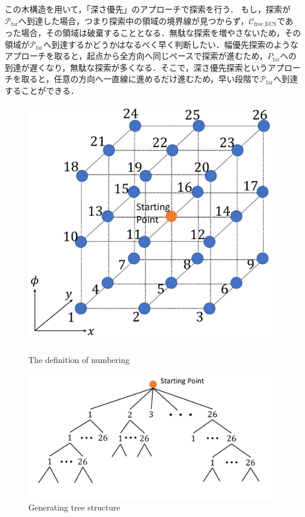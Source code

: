 \documentclass[a4paper,twoside,12pt,papersize, dvipdfmx]{iirthesis}
\begin{document}
この木構造を用いて，「深さ優先」のアプローチで探索を行う．
もし，探索が$\mathcal{P}_{\mathrm {far}}$へ到達した場合，つまり探索中の領域の境界線が見つからず，$\mathcal{C}_{\mathrm{free\_ECS}}$であった場合，その領域は破棄することとなる．無駄な探索を増やさないため，その領域が$\mathcal{P}_{\mathrm {far}}$へ到達するかどうかはなるべく早く判断したい．幅優先探索のようなアプローチを取ると，起点から全方向へ同じペースで探索が進むため，$P_{\mathrm {far}}$への到達が遅くなり，無駄な探索が多くなる．そこで，深さ優先探索というアプローチを取ると，任意の方向へ一直線に進めるだけ進むため，早い段階で$\mathcal{P}_{\mathrm {far}}$へ到達することができる．\par

\begin{figure}[bt]
\centering
\begin{minipage}{0.4\hsize}
\includegraphics[width=0.9\hsize]{fig/3-new-planner/directiondef.pdf}
\caption{The definition of numbering}\label{fig::planner::numbering}
\end{minipage}\hfill
\begin{minipage}{0.59\hsize}
\includegraphics[width=\hsize]{fig/3-new-planner/treegraph.pdf}
\caption{Generating tree structure}\label{fig::planner::treegraph}
\end{minipage}
\end{figure}
\end{document}
